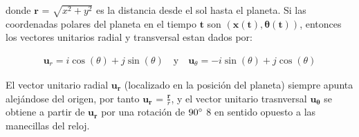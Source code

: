 \documentclass{article}
\begin{document}
	donde $\mathbf{r}$  = $\sqrt{x^2 + y^2}$ es la distancia desde el sol hasta el planeta. Si las coordenadas polares del planeta en el tiempo $\mathbf{t}$ son $\mathbf{(x(t),\theta(t))}$, entonces los vectores unitarios radial y transversal estan dados por:
	
	\begin{equation} 
		\begin{aligned}
			\mathbf{u}_r = i \cos(\theta) + j \sin(\theta)  \quad \text{y} \quad \mathbf{u}_\theta = -i \sin(\theta) + j \cos(\theta) 
	    \end{aligned}
	\end{equation} 
	
	El vector unitario radial $\mathbf{u_{r}}$  (localizado en la posición del planeta) siempre apunta alejándose del origen, por tanto $\mathbf{u_{r}}$ = $\frac{\mathbf{r}}{r}$, y el vector unitario trasnversal $\mathbf{u_{\theta}}$ se obtiene a partir de $\mathbf{u_{r}}$ por una rotación de $90\degree$ 8 en sentido opuesto a las manecillas del reloj.
	
   \clearpage 
	
\end{document}
